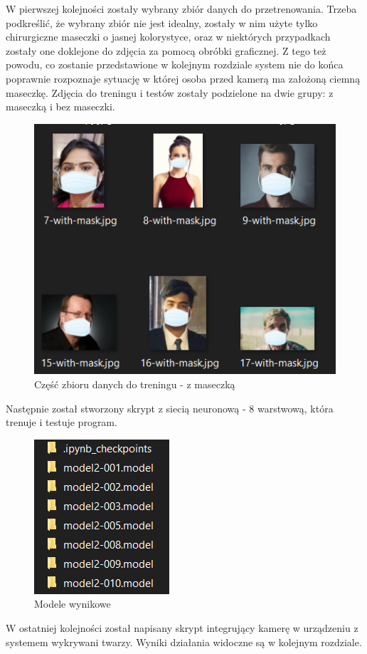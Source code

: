 \documentclass[12pt,a4paper]{article}
\begin{document}
W pierwszej kolejności zostały wybrany zbiór danych do przetrenowania. Trzeba podkreślić, że wybrany zbiór nie jest idealny, zostały w nim użyte tylko chirurgiczne maseczki o jasnej kolorystyce, oraz w niektórych przypadkach zostały one doklejone do zdjęcia za pomocą obróbki graficznej. Z tego też powodu, co zostanie przedstawione w kolejnym rozdziale system nie do końca poprawnie rozpoznaje sytuację w której osoba przed kamerą ma założoną ciemną maseczkę. Zdjęcia do treningu i testów zostały podzielone na dwie grupy: z maseczką i bez maseczki.
\begin{figure}[h!]
    \centering
    \includegraphics[scale = 1]{media/mask.png}
    \caption{Część zbioru danych do treningu - z maseczką}
    \label{fig:Rysunek1}
\end{figure}
\newpage
Następnie został stworzony skrypt z siecią neuronową - 8 warstwową, która trenuje i testuje program. 
\begin{figure}[h!]
    \centering
    \includegraphics[scale = 1]{media/modele.png}
    \caption{Modele wynikowe}
    \label{fig:Rysunek1}
\end{figure}
W ostatniej kolejności został napisany skrypt integrujący kamerę w urządzeniu z systemem wykrywani twarzy. Wyniki działania widoczne są w kolejnym rozdziale.
\end{document}
